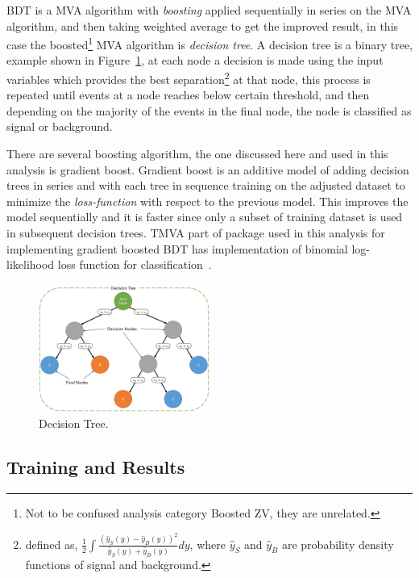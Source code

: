 \gls{BDT} is a \gls{MVA} algorithm with \textit{boosting}
applied sequentially in series on the \gls{MVA} algorithm, and
then taking weighted average to get the improved result,
in this case the boosted\footnote{Not to be confused analysis category
  Boosted ZV, they are unrelated.} \gls{MVA} algorithm is \textit{decision tree}.
A decision tree is a binary tree,
example shown in Figure~\ref{fig:bdt-dt}, at each node
a decision is made using the input variables which
provides the best separation\footnote{defined as,
  \( \frac{1}{2}
  \int \frac{{(\hat{y}_{S}(y) - \hat{y}_{B}(y))}^2}{\hat{y}_{S}(y) + \hat{y}_{B}(y)} dy \),
  where \(\hat{y}_{S}\) and \(\hat{y}_B\) are probability density functions
  of signal and background.}
at that node, this process is repeated
until events at a node reaches below certain threshold, and then depending
on the majority
of the events in the final node, the node is classified
as signal or background.

There are several boosting algorithm, the one discussed here and
used in this analysis is gradient boost.
Gradient boost is an additive model of adding decision trees
in series and with each tree in sequence training on
the adjusted dataset to minimize the \textit{loss-function} with
respect to the previous model. This improves
the model sequentially and it is faster since only a subset of
training dataset is used in subsequent decision trees.
\gls{TMVA} part of \ROOT{} package used in this analysis
for implementing gradient boosted \gls{BDT} has implementation
of binomial log-likelihood loss function for classification~\cite{tmva-manual}.

\begin{figure}
  \centering
  \includegraphics[width=0.5\textwidth]{figures/bdt_pics.pdf}
  \caption[Decision Tree]{Decision Tree.}%
  \label{fig:bdt-dt}
\end{figure}

\subsection{
  Training and Results
}

